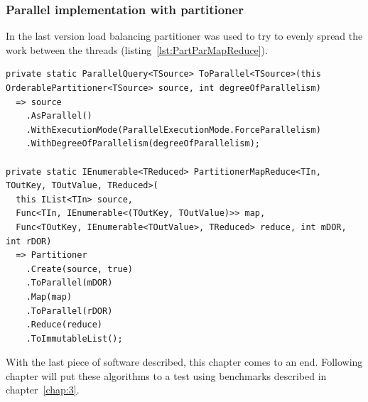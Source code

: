 \subsubsection{Parallel implementation with partitioner}
In the last version load balancing partitioner was used to try to evenly spread the work between the threads (listing~\ref{lst:PartParMapReduce}).

\begin{lstlisting}[language={[sharp]c}, style=sharpcstyle, caption={Parallel \texttt{MapReduce} implementation with partitioner}, label={lst:PartParMapReduce},
numbers=none, xleftmargin=0pt,framexleftmargin=0pt,framexrightmargin=0pt,framexbottommargin=0pt]
private static ParallelQuery<TSource> ToParallel<TSource>(this OrderablePartitioner<TSource> source, int degreeOfParallelism)
  => source
    .AsParallel()
    .WithExecutionMode(ParallelExecutionMode.ForceParallelism)
    .WithDegreeOfParallelism(degreeOfParallelism);

private static IEnumerable<TReduced> PartitionerMapReduce<TIn, TOutKey, TOutValue, TReduced>(
  this IList<TIn> source,
  Func<TIn, IEnumerable<(TOutKey, TOutValue)>> map,
  Func<TOutKey, IEnumerable<TOutValue>, TReduced> reduce, int mDOR, int rDOR)
  => Partitioner
    .Create(source, true)
    .ToParallel(mDOR)
    .Map(map)
    .ToParallel(rDOR)
    .Reduce(reduce)
    .ToImmutableList();
\end{lstlisting}

With the last piece of software described, this chapter comes to an end. Following chapter will put these algorithms to a test using benchmarks described in chapter~\ref{chap:3}.


